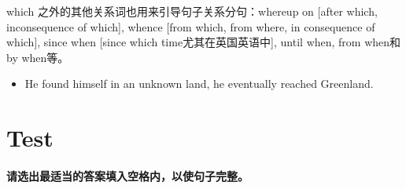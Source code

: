 which 之外的其他关系词也用来引导句子关系分句：whereup on [after which,
inconsequence of which], whence [from which, from where, in consequence of
which], since when [since which time尤其在英国英语中], until when, from
when和 by when等。

\begin{itemize}
\item He found himself in an unknown land,  he eventually reached Greenland.
\end{itemize}

\section{Test}

\paragraph{请选出最适当的答案填入空格内，以使句子完整。}

